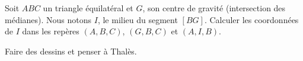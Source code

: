 
\begin{exercice}\label{exoSeconde-0062}

    Soit \( ABC\) un triangle équilatéral et \( G\), son centre de gravité (intersection des médianes). Nous notons \( I\), le milieu du segment \( [BG]\). Calculer les coordonnées de \( I\) dans les repères \( (A,B,C)\), \( (G,B,C)\) et \( (A,I,B)\).

    Faire des dessins et penser à Thalès.

\end{exercice}
